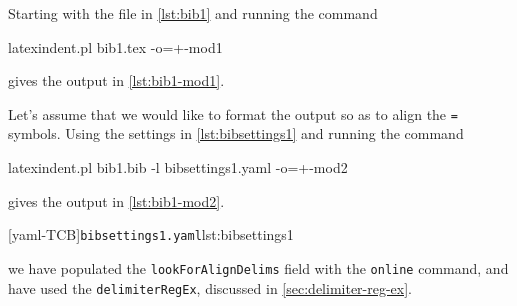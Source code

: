   \begin{example}

  Starting with the file in \cref{lst:bib1} and running the command    

  \begin{commandshell}
latexindent.pl bib1.tex -o=+-mod1 
   \end{commandshell}

  gives the output in \cref{lst:bib1-mod1}.

  \begin{widepage}
   \begin{cmhtcbraster}[raster column skip=.01\linewidth]
   \end{cmhtcbraster}
  \end{widepage}

  Let's assume that we would like to format the output so as to align the \texttt{=}
  symbols. Using the settings in \cref{lst:bibsettings1} and running the command

  \begin{commandshell}
latexindent.pl bib1.bib -l bibsettings1.yaml -o=+-mod2 
     \end{commandshell}

  gives the output in \cref{lst:bib1-mod2}.

  \begin{widepage}
   \begin{cmhtcbraster}[raster column skip=.1\linewidth]
    [yaml-TCB]{\texttt{bibsettings1.yaml}}{lst:bibsettings1}
   \end{cmhtcbraster}
  \end{widepage}
  we have populated the \texttt{lookForAlignDelims} field with the \texttt{online}
  command, and have used the \texttt{delimiterRegEx}, discussed in
  \vref{sec:delimiter-reg-ex}.
  \end{example}

